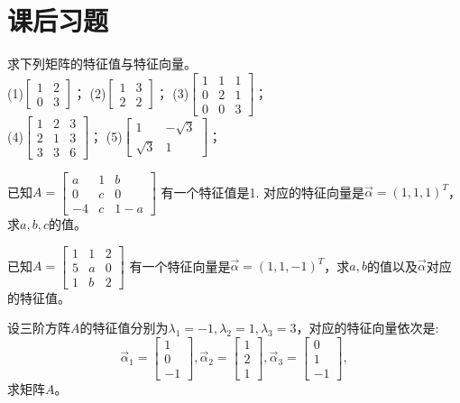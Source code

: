 \section{课后习题}

\begin{ex}\label{7.1}
求下列矩阵的特征值与特征向量。\\
(1)$\begin{bmatrix}1&2\\0&3\end{bmatrix}$；
(2)$\begin{bmatrix}1&3\\2&2\end{bmatrix}$；
(3)$\begin{bmatrix}1&1&1\\0&2&1\\0&0&3\end{bmatrix}$；\\
(4)$\begin{bmatrix}1&2&3\\2&1&3\\3&3&6\end{bmatrix}$；
(5)$\begin{bmatrix}1&-\sqrt{3}\\ \sqrt{3}&1\end{bmatrix}$；
\end{ex}

\begin{ex}\label{7.2}
已知$A=\begin{bmatrix}a&1&b\\0&c&0\\-4&c&1-a\end{bmatrix}$ 有一个特征值是1. 对应的特征向量是$\vec{\alpha}=(1,1,1)^T$，求$a,b,c$的值。
\end{ex}

\begin{ex}\label{7.3}
已知$A=\begin{bmatrix}1&1&2\\5&a&0\\1&b&2\end{bmatrix}$ 有一个特征向量是$\vec{\alpha}=(1,1,-1)^T$，求$a,b$的值以及$\vec{\alpha}$对应的特征值。
\end{ex}

\begin{ex}\label{7.4}
设三阶方阵$A$的特征值分别为$\lambda_1=-1,\lambda_2=1,\lambda_3=3$，对应的特征向量依次是:
\begin{equation*}
\vec{\alpha}_1=\begin{bmatrix}1\\0\\-1\end{bmatrix},
\vec{\alpha}_2=\begin{bmatrix}1\\2\\1\end{bmatrix},
\vec{\alpha}_3=\begin{bmatrix}0\\1\\-1\end{bmatrix},
\end{equation*}
求矩阵$A$。
\end{ex}

